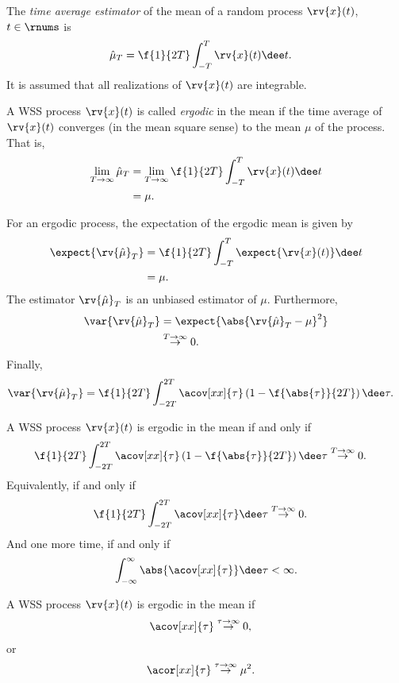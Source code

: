 \begin{definitionBox}
    The \emph{time average estimator} of the mean of a random process $\rv{x}(t)$, $t\in\rnums$ is
    \begin{align}
        \hat{\mu}_{T} &= \f{1}{2T}\int_{-T}^{T}\rv{x}(t)\dee t.
    \end{align}
    It is assumed that all realizations of $\rv{x}(t)$ are integrable.
\end{definitionBox}

\begin{definitionBox}[Ergodic]
    A WSS process $\rv{x}(t)$ is called \emph{ergodic} in the mean if the time average of $\rv{x}(t)$ converges (in the mean square sense) to the mean $\mu$ of the process. That is,
    \begin{align}
        \lim_{T\to\infty}\hat{\mu}_{T} &= \lim_{T\to\infty}\f{1}{2T}\int_{-T}^{T}\rv{x}(t)\dee t\\
        &= \mu.
    \end{align}
\end{definitionBox}
\begin{remarkBox}
    For an ergodic process, the expectation of the ergodic mean is given by
    \begin{align}
        \expect{ \rv{\hat{\mu}}_{T}} &= \f{1}{2T}\int_{-T}^{T}\expect{\rv{x}(t)}\dee t\\
        &= \mu.
    \end{align}
    The estimator $\rv{\hat{\mu}}_{T}$ is an unbiased estimator of $\mu$. Furthermore, 
    \begin{align}
        \var{\rv{\hat{\mu}}_{T}} &= \expect{\abs{\rv{\hat{\mu}}_{T}-\mu}^{2}}\\
        &\overset{T\to\infty}{\to} 0.
    \end{align}
    Finally,
    \begin{align}
        \var{\rv{\hat{\mu}}_{T}} &= \f{1}{2T}\int_{-2T}^{2T}\acov[xx]{\tau}\left( 1-\f{\abs{\tau}}{2T} \right)\dee\tau.
    \end{align}
\end{remarkBox}

\begin{theoremBox}   
     A WSS process $\rv{x}(t)$ is ergodic in the mean if and only if
     \begin{align}
         \f{1}{2T}\int_{-2T}^{2T}\acov[xx]{\tau}\left( 1-\f{\abs{\tau}}{2T} \right)\dee \tau
         &\overset{T\to\infty}{\to} 0.
     \end{align}
     Equivalently, if and only if 
     \begin{align}
        \f{1}{2T}\int_{-2T}^{2T}\acov[xx]{\tau}\dee \tau
        &\overset{T\to\infty}{\to} 0.
     \end{align}
     And one more time, if and only if
     \begin{align}
         \int_{-\infty}^{\infty}\abs{\acov[xx]{\tau}}\dee\tau<\infty.
     \end{align}
\end{theoremBox}

\begin{theoremBox}
     A WSS process $\rv{x}(t)$ is ergodic in the mean if 
     \begin{align}
         \acov[xx]{\tau}&\overset{\tau\to\infty}{\to} 0,
     \end{align}
     or
     \begin{align}
         \acor[xx]{\tau}&\overset{\tau\to\infty}{\to} \mu^{2}.
     \end{align}
\end{theoremBox}